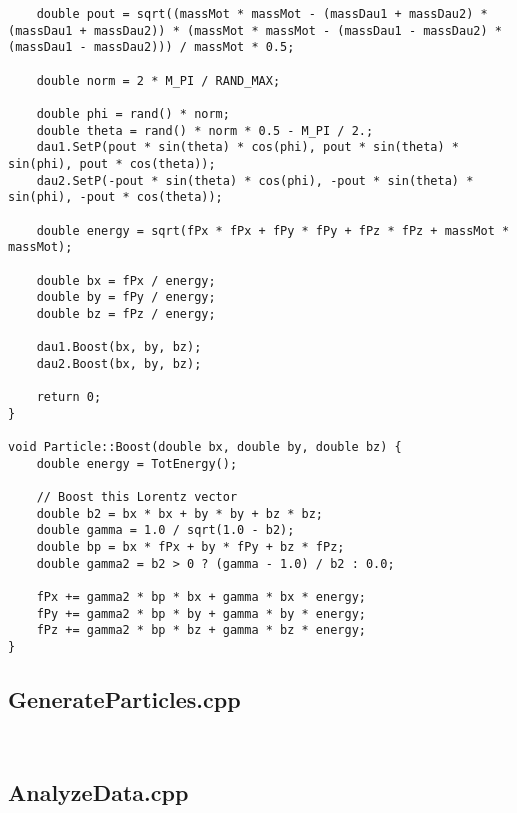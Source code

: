 \documentclass{article}
\begin{document}
\begin{verbatim}
    double pout = sqrt((massMot * massMot - (massDau1 + massDau2) * (massDau1 + massDau2)) * (massMot * massMot - (massDau1 - massDau2) * (massDau1 - massDau2))) / massMot * 0.5;

    double norm = 2 * M_PI / RAND_MAX;

    double phi = rand() * norm;
    double theta = rand() * norm * 0.5 - M_PI / 2.;
    dau1.SetP(pout * sin(theta) * cos(phi), pout * sin(theta) * sin(phi), pout * cos(theta));
    dau2.SetP(-pout * sin(theta) * cos(phi), -pout * sin(theta) * sin(phi), -pout * cos(theta));

    double energy = sqrt(fPx * fPx + fPy * fPy + fPz * fPz + massMot * massMot);

    double bx = fPx / energy;
    double by = fPy / energy;
    double bz = fPz / energy;

    dau1.Boost(bx, by, bz);
    dau2.Boost(bx, by, bz);

    return 0;
}

void Particle::Boost(double bx, double by, double bz) {
    double energy = TotEnergy();

    // Boost this Lorentz vector
    double b2 = bx * bx + by * by + bz * bz;
    double gamma = 1.0 / sqrt(1.0 - b2);
    double bp = bx * fPx + by * fPy + bz * fPz;
    double gamma2 = b2 > 0 ? (gamma - 1.0) / b2 : 0.0;

    fPx += gamma2 * bp * bx + gamma * bx * energy;
    fPy += gamma2 * bp * by + gamma * by * energy;
    fPz += gamma2 * bp * bz + gamma * bz * energy;
}
\end{verbatim}

\subsection*{GenerateParticles.cpp}
\begin{verbatim}
    
\end{verbatim}

\subsection*{AnalyzeData.cpp}
\begin{verbatim}
    
\end{verbatim}
\end{document}
